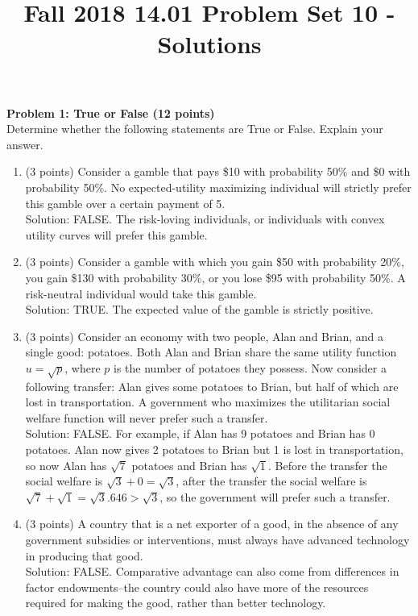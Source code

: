 
\title{Fall 2018 14.01 Problem Set 10 - Solutions}
\date{}
\maketitle

\noindent\textbf{Problem 1: True or False (12 points)} \\
Determine whether the following statements are True or False. Explain your answer.

\begin{enumerate}
    \item (3 points) Consider a gamble that pays \$10 with probability 50\% and \$0 with probability 50\%. No expected-utility maximizing individual will strictly prefer this gamble over a certain payment of 5. \\
    Solution: FALSE. The risk-loving individuals, or individuals with convex utility curves will prefer this gamble.
    \item (3 points) Consider a gamble with which you gain \$50 with probability 20\%, you gain \$130 with probability 30\%, or you lose \$95 with probability 50\%. A risk-neutral individual would take this gamble. \\
    Solution: TRUE. The expected value of the gamble is strictly positive.
    \item (3 points) Consider an economy with two people, Alan and Brian, and a single good: potatoes. Both Alan and Brian share the same utility function $u = \sqrt{p}$, where $p$ is the number of potatoes they possess. Now consider a following transfer: Alan gives some potatoes to Brian, but half of which are lost in transportation. A government who maximizes the utilitarian social welfare function will never prefer such a transfer. \\
    Solution: FALSE. For example, if Alan has 9 potatoes and Brian has 0 potatoes. Alan now gives 2 potatoes to Brian but 1 is lost in transportation, so now Alan has $\sqrt{7}$ potatoes and Brian has $\sqrt{1}$. Before the transfer the social welfare is $\sqrt{3} + 0 = \sqrt{3}$, after the transfer the social welfare is $\sqrt{7} + \sqrt{1} = \sqrt{3}.646 > \sqrt{3}$, so the government will prefer such a transfer.
    \item (3 points) A country that is a net exporter of a good, in the absence of any government subsidies or interventions, must always have advanced technology in producing that good. \\
    Solution: FALSE. Comparative advantage can also come from differences in factor endowments--the country could also have more of the resources required for making the good, rather than better technology.
\end{enumerate}


